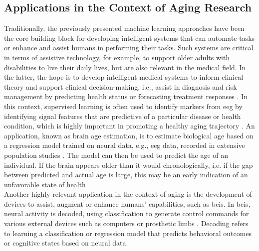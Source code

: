 \subsection{Applications in the Context of Aging Research}
\label{theory:ml:applications_aging}
Traditionally, the previously presented machine learning approaches have been the core building block for developing intelligent systems that can automate tasks or enhance and assist humans in performing their tasks. Such systems are critical in terms of assistive technology, for example, to support older adults with disabilities to live their daily lives, but are also relevant in the medical field. In the latter, the hope is to develop intelligent medical systems to inform clinical theory and support clinical decision-making, i.e., assist in diagnosis and risk management by predicting health status or forecasting treatment responses \cite{Woo2017}. In this context, supervised learning is often used to identify markers from \gls{eeg} by identifying signal features that are predictive of a particular disease or health condition, which is highly important in promoting a healthy aging trajectory \cite{Babiloni2021,Mei2021}. An application, known as brain age estimation, is to estimate biological age based on a regression model trained on neural data, e.g., \gls{eeg} data, recorded in extensive population studies \cite{Engemann2022}. The model can then be used to predict the age of an individual. If the brain appears older than it would chronologically, i.e. if the gap between predicted and actual age is large, this may be an early indication of an unfavorable state of health \cite{Gonneaud2021}.\\
Another highly relevant application in the context of aging is the development of devices to assist, augment or enhance humans' capabilities, such as \glspl{bci}. In \glspl{bci}, neural activity is decoded, using classification to generate control commands for various external devices such as computers or prosthetic limbs \cite{Saha2021, Anumanchipalli2019}. Decoding refers to learning a classification or regression model that predicts behavioral outcomes or cognitive states based on neural data. \\
